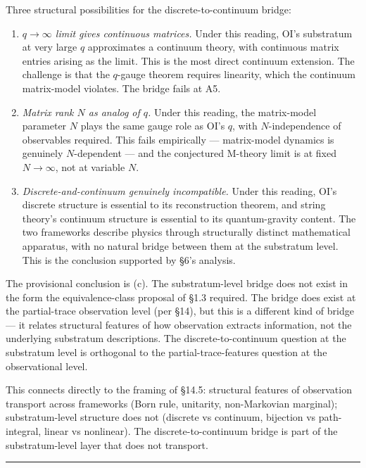 \documentclass[
]{article}
\begin{document}
Three structural possibilities for the discrete-to-continuum bridge:

\begin{enumerate}
\def\labelenumi{(\alph{enumi})}
\item
  \emph{\(q \to \infty\) limit gives continuous matrices.} Under this
  reading, OI's substratum at very large \(q\) approximates a continuum
  theory, with continuous matrix entries arising as the limit. This is
  the most direct continuum extension. The challenge is that the
  \(q\)-gauge theorem requires linearity, which the continuum
  matrix-model violates. The bridge fails at A5.
\item
  \emph{Matrix rank \(N\) as analog of \(q\).} Under this reading, the
  matrix-model parameter \(N\) plays the same gauge role as OI's \(q\),
  with \(N\)-independence of observables required. This fails
  empirically --- matrix-model dynamics is genuinely \(N\)-dependent ---
  and the conjectured M-theory limit is at fixed \(N \to \infty\), not
  at variable \(N\).
\item
  \emph{Discrete-and-continuum genuinely incompatible.} Under this
  reading, OI's discrete structure is essential to its reconstruction
  theorem, and string theory's continuum structure is essential to its
  quantum-gravity content. The two frameworks describe physics through
  structurally distinct mathematical apparatus, with no natural bridge
  between them at the substratum level. This is the conclusion supported
  by §6's analysis.
\end{enumerate}

The provisional conclusion is (c). The substratum-level bridge does not
exist in the form the equivalence-class proposal of §1.3 required. The
bridge does exist at the partial-trace observation level (per §14), but
this is a different kind of bridge --- it relates structural features of
how observation extracts information, not the underlying substratum
descriptions. The discrete-to-continuum question at the substratum level
is orthogonal to the partial-trace-features question at the
observational level.

This connects directly to the framing of §14.5: structural features of
observation transport across frameworks (Born rule, unitarity,
non-Markovian marginal); substratum-level structure does not (discrete
vs continuum, bijection vs path-integral, linear vs nonlinear). The
discrete-to-continuum bridge is part of the substratum-level layer that
does not transport.

\begin{center}\rule{0.5\linewidth}{0.5pt}\end{center}
\end{document}
